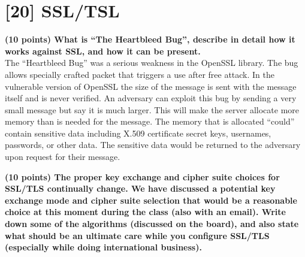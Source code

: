 \documentclass[letterpaper,11pt,notitlepage,fleqn]{article}
\begin{document}
\section{[20] SSL/TSL}
\noindent\textbf{(10 points) What is ``The Heartbleed Bug'', describe in detail how it works against SSL, and how it can be present.} \\
The ``Heartbleed Bug'' was a serious weakness in the OpenSSL library. The bug allows specially crafted packet that triggers a use after free attack. In the vulnerable version of OpenSSL the size of the message is sent with the message itself and is never verified. An adversary can exploit this bug by sending a very small message but say it is much larger. This will make the server allocate more memory than is needed for the message. The memory that is allocated ``could'' contain sensitive data including
X.509 certificate secret keys, usernames, passwords, or other data. The sensitive data would be returned to the adversary upon request for their message. 

\noindent\textbf{(10 points) The proper key exchange and cipher suite choices for SSL/TLS continually change. We have discussed a potential key exchange mode and cipher suite selection that would be a reasonable choice at this moment during the class (also with an email). Write down some of the algorithms (discussed on the board), and also state what should be an ultimate care while you conﬁgure SSL/TLS (especially while doing international business).} \\
\end{document}
